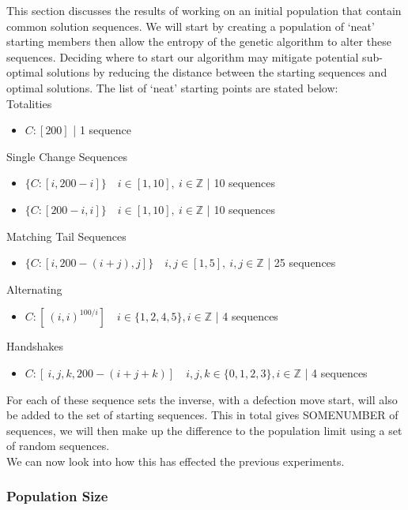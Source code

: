 This section discusses the results of working on an initial population that contain common solution sequences.
We will start by creating a population of `neat' starting members then allow the entropy of the genetic algorithm to alter these sequences.
Deciding where to start our algorithm may mitigate potential sub-optimal solutions by reducing the distance between the starting sequences and optimal solutions.
The list of `neat' starting points are stated below:\\

Totalities
\begin{itemize}
\item \(C:[200]\) | 1 sequence
\end{itemize}

Single Change Sequences
\begin{itemize}
\item \(\{C:[i,200-i]\} \quad i\in [1,10],\ i \in \mathbb{Z}\) | 10 sequences
\item \(\{C:[200-i,i]\} \quad i\in [1,10],\ i \in \mathbb{Z}\) | 10 sequences
\end{itemize}

Matching Tail Sequences
\begin{itemize}
\item \(\{C:[i,200-(i+j),j]\} \quad i,j \in [1,5],\ i,j \in \mathbb{Z}\) | 25 sequences
\end{itemize}

Alternating 
\begin{itemize}
\item \(C:[\ (i,i)^{100/i}] \quad i \in \{1,2,4,5\}, i \in \mathbb{Z}\) | 4 sequences
\end{itemize}

Handshakes 
\begin{itemize}
\item \(C:[\ i,j,k,200-(i+j+k)] \quad i,j,k \in \{0,1,2,3\}, i \in \mathbb{Z}\) | 4 sequences
\end{itemize}

For each of these sequence sets the inverse, with a defection move start, will also be added to the set of starting sequences.
This in total gives SOMENUMBER of sequences, we will then make up the difference to the population limit using a set of random sequences.\\

We can now look into how this has effected the previous experiments.

\subsubsection{Population Size}


